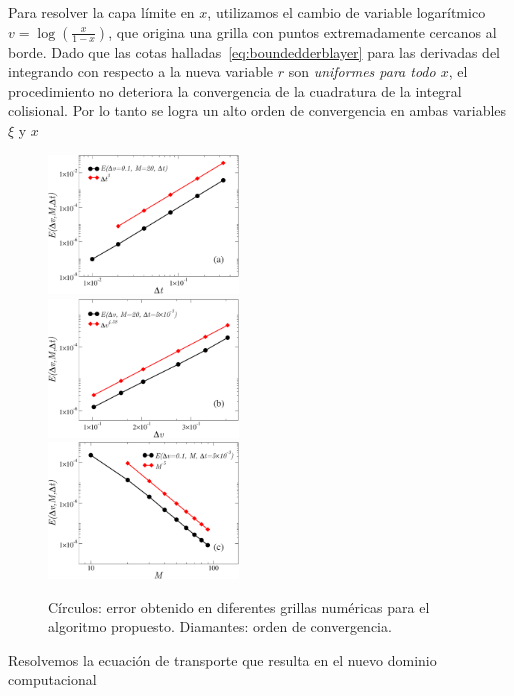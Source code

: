 Para resolver la capa límite en $x$, utilizamos 
el cambio de variable logarítmico $v=\log(\frac{x}{1-x})$, 
que origina una grilla con puntos extremadamente cercanos al borde. 
Dado que las cotas halladas~\eqref{eq:boundedderblayer} para las derivadas del 
integrando con respecto a la nueva variable $r$ son {\em uniformes para todo $x$},  
el procedimiento no deteriora la convergencia de la 
cuadratura de la integral colisional.  Por lo tanto 
se logra un alto orden de convergencia en ambas variables $\xi$ y $x$
\begin{figure}
  \includegraphics[width=0.45\textwidth]{figuras/errdt.pdf}\\
  \vspace{2mm}
  \includegraphics[width=0.45\textwidth]{figuras/errdx.pdf}\\
  \vspace{2mm}
  \includegraphics[width=0.45\textwidth]{figuras/xiconv.pdf}
  \caption{Círculos: error obtenido en diferentes grillas numéricas para el algoritmo 
  propuesto. Diamantes: orden de convergencia.}
 \label{fig:conv}
\end{figure}
Resolvemos la ecuación de transporte que resulta en el nuevo dominio computacional
